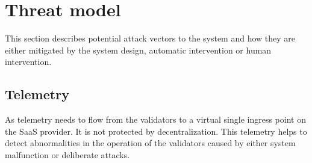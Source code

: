 \section{Threat model}

This section describes potential attack vectors to the system and how they are either mitigated by the system design, automatic intervention or human intervention.

\subsection{Telemetry}

As telemetry needs to flow from the validators to a virtual single ingress point on the SaaS provider. It is not protected by decentralization.
This telemetry helps to detect abnormalities in the operation of the validators caused by either system malfunction or deliberate attacks.

